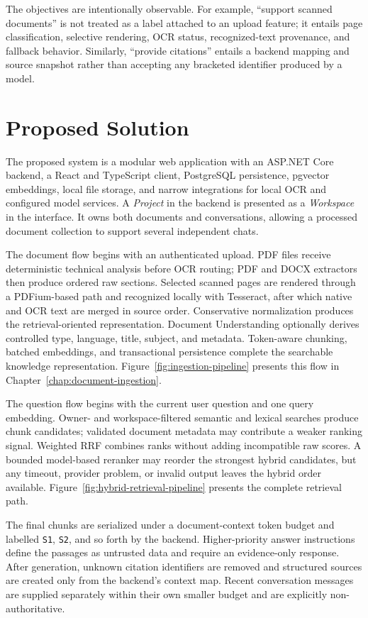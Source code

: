 The objectives are intentionally observable. For example, ``support scanned documents'' is not treated as a label attached to an upload feature; it entails page classification, selective rendering, OCR status, recognized-text provenance, and fallback behavior. Similarly, ``provide citations'' entails a backend mapping and source snapshot rather than accepting any bracketed identifier produced by a model.

\section{Proposed Solution}
\label{sec:introduction-solution}

The proposed system is a modular web application with an ASP.NET Core backend, a React and TypeScript client, PostgreSQL persistence, pgvector embeddings, local file storage, and narrow integrations for local OCR and configured model services. A \emph{Project} in the backend is presented as a \emph{Workspace} in the interface. It owns both documents and conversations, allowing a processed document collection to support several independent chats.

The document flow begins with an authenticated upload. PDF files receive deterministic technical analysis before OCR routing; PDF and DOCX extractors then produce ordered raw sections. Selected scanned pages are rendered through a PDFium-based path and recognized locally with Tesseract, after which native and OCR text are merged in source order. Conservative normalization produces the retrieval-oriented representation. Document Understanding optionally derives controlled type, language, title, subject, and metadata. Token-aware chunking, batched embeddings, and transactional persistence complete the searchable knowledge representation. Figure~\ref{fig:ingestion-pipeline} presents this flow in Chapter~\ref{chap:document-ingestion}.

The question flow begins with the current user question and one query embedding. Owner- and workspace-filtered semantic and lexical searches produce chunk candidates; validated document metadata may contribute a weaker ranking signal. Weighted RRF combines ranks without adding incompatible raw scores. A bounded model-based reranker may reorder the strongest hybrid candidates, but any timeout, provider problem, or invalid output leaves the hybrid order available. Figure~\ref{fig:hybrid-retrieval-pipeline} presents the complete retrieval path.

The final chunks are serialized under a document-context token budget and labelled \texttt{S1}, \texttt{S2}, and so forth by the backend. Higher-priority answer instructions define the passages as untrusted data and require an evidence-only response. After generation, unknown citation identifiers are removed and structured sources are created only from the backend's context map. Recent conversation messages are supplied separately within their own smaller budget and are explicitly non-authoritative.

